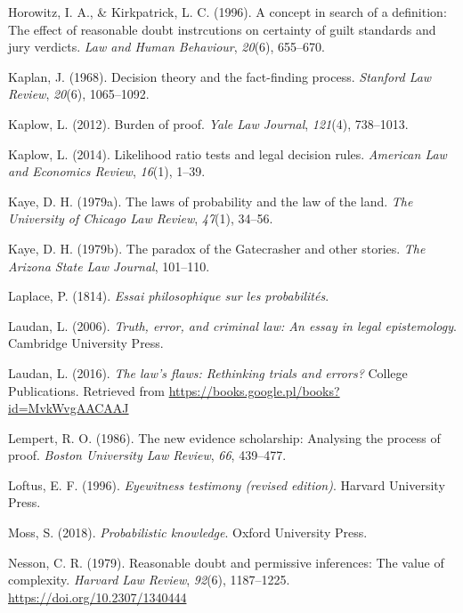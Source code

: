\documentclass[10pt,dvipsnames,enabledeprecatedfontcommands]{scrartcl}
\begin{document}
\leavevmode\hypertarget{ref-Horowitz1996}{}%
Horowitz, I. A., \& Kirkpatrick, L. C. (1996). A concept in search of a
definition: The effect of reasonable doubt instrcutions on certainty of
guilt standards and jury verdicts. \emph{Law and Human Behaviour},
\emph{20}(6), 655--670.

\leavevmode\hypertarget{ref-Kaplan1968decision}{}%
Kaplan, J. (1968). Decision theory and the fact-finding process.
\emph{Stanford Law Review}, \emph{20}(6), 1065--1092.

\leavevmode\hypertarget{ref-kaplow2012}{}%
Kaplow, L. (2012). Burden of proof. \emph{Yale Law Journal},
\emph{121}(4), 738--1013.

\leavevmode\hypertarget{ref-kaplow2014likelihood}{}%
Kaplow, L. (2014). Likelihood ratio tests and legal decision rules.
\emph{American Law and Economics Review}, \emph{16}(1), 1--39.

\leavevmode\hypertarget{ref-kaye79}{}%
Kaye, D. H. (1979a). The laws of probability and the law of the land.
\emph{The University of Chicago Law Review}, \emph{47}(1), 34--56.

\leavevmode\hypertarget{ref-Kaye79gate}{}%
Kaye, D. H. (1979b). The paradox of the Gatecrasher and other stories.
\emph{The Arizona State Law Journal}, 101--110.

\leavevmode\hypertarget{ref-Laplace1814}{}%
Laplace, P. (1814). \emph{Essai philosophique sur les probabilités}.

\leavevmode\hypertarget{ref-laudan2006truth}{}%
Laudan, L. (2006). \emph{Truth, error, and criminal law: An essay in
legal epistemology}. Cambridge University Press.

\leavevmode\hypertarget{ref-laudan2016law}{}%
Laudan, L. (2016). \emph{The law's flaws: Rethinking trials and errors?}
College Publications. Retrieved from
\url{https://books.google.pl/books?id=MvkWvgAACAAJ}

\leavevmode\hypertarget{ref-Lempert1986}{}%
Lempert, R. O. (1986). The new evidence scholarship: Analysing the
process of proof. \emph{Boston University Law Review}, \emph{66},
439--477.

\leavevmode\hypertarget{ref-Loftus1996}{}%
Loftus, E. F. (1996). \emph{Eyewitness testimony (revised edition)}.
Harvard University Press.

\leavevmode\hypertarget{ref-moss2018}{}%
Moss, S. (2018). \emph{Probabilistic knowledge}. Oxford University
Press.

\leavevmode\hypertarget{ref-Nesson1979Reasonable-doub}{}%
Nesson, C. R. (1979). Reasonable doubt and permissive inferences: The
value of complexity. \emph{Harvard Law Review}, \emph{92}(6),
1187--1225. \url{https://doi.org/10.2307/1340444}
\end{document}
